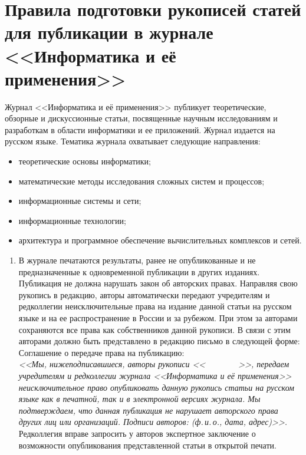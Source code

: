 \vspace*{-60pt} {\small {\baselineskip=10.65pt
\section*{Правила подготовки рукописей статей для публикации в журнале
<<Информатика и её применения>>}

\thispagestyle{empty}

 Журнал <<Информатика и её применения>> публикует
теоретические, обзорные и дискуссионные статьи, посвященные научным
исследованиям и разработкам в области информатики и ее приложений. Журнал
издается на русском языке. Тематика журнала охватывает следующие направления:
\begin{itemize}
\item теоретические основы информатики;
\item математические методы исследования сложных систем и процессов;
\item информационные системы и сети;
\item информационные технологии;
\item архитектура и программное
обеспечение вычислительных комплексов и сетей.
\end{itemize}
\begin{enumerate}
\item В журнале печатаются результаты, ранее не
опубликованные и не предназначенные к одновременной публикации в других
изданиях. Публикация не должна нарушать закон об авторских правах. Направляя
свою рукопись в редакцию, авторы автоматически передают учредителям и
редколлегии неисключительные права на издание данной статьи на русском языке и
на ее распространение в России и за рубежом. При этом за авторами сохраняются
все права как собственников данной рукописи. В связи с этим авторами должно
быть представлено в редакцию письмо в следующей форме:
Соглашение о передаче права на публикацию:\\
\textit{<<Мы, нижеподписавшиеся, авторы рукописи <<$\qquad\qquad$>>, передаем
учредителям и редколлегии журнала <<Информатика и её применения>>
неисключительное право опубликовать данную рукопись статьи на русском языке как
в печатной, так и в электронной версиях журнала. Мы подтверждаем, что данная
публикация не нарушает авторского права других лиц или организаций. Подписи
авторов: (ф.\,и.\,о., дата, адрес)>>.}\\
Редколлегия вправе запросить у авторов экспертное заключение о возможности
опубликования представленной статьи в открытой печати.

\end{enumerate}}}

